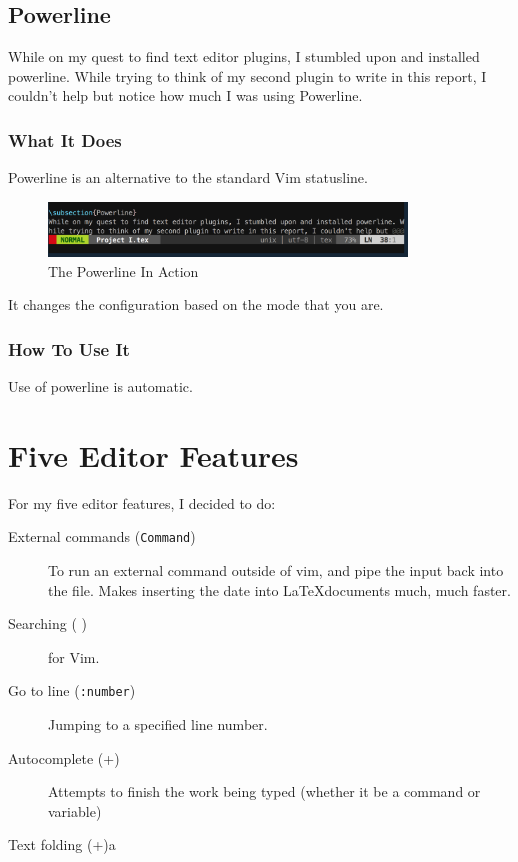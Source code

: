 \documentclass{article}
\newcommand{\shellcmd}[1]{\texttt{\colorbox{gray!30}{#1}}}
\begin{document}
\subsection{Powerline}
While on my quest to find text editor plugins, I stumbled upon and installed powerline. While trying to think of my second plugin to write in this report, I couldn't help but notice how much I was using Powerline.

\subsubsection{What It Does}
Powerline is an alternative to the standard Vim statusline.

\begin{figure}[!ht]
    \centering
    \includegraphics[width=0.85\textwidth]{assets/powerline.png}
    \caption{The Powerline In Action}
\end{figure}

It changes the configuration based on the mode that you are.

\subsubsection{How To Use It}
Use of powerline is automatic.

\section{Five Editor Features}
For my five editor features, I decided to do:


\begin{description}
    \item [External commands (\keys{!}\shellcmd{Command})] To run an external command outside of vim, and pipe the input back into the file. Makes inserting the date into \LaTeX documents much, much faster.
    \item [Searching (\keys{\slash} )]  for Vim.
    \item [Go to line (\texttt{:number})] Jumping to a specified line number.
    \item [Autocomplete (+)] Attempts to finish the work being typed (whether it be a command or variable)
    \item [Text folding (+)a]
\end{description}
\end{document}
